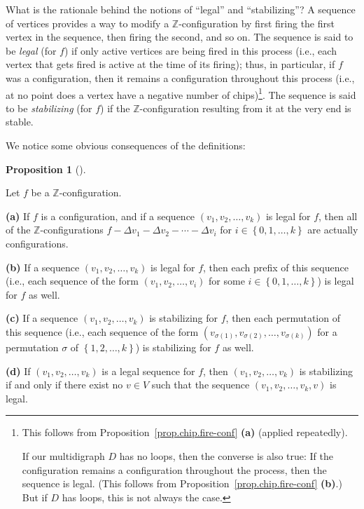 \documentclass[numbers=enddot,12pt,final,onecolumn,notitlepage]{scrartcl}%
\theoremstyle{definition}
\newtheorem{prop}[theo]{Proposition}
\newenvironment{proposition}[1][]
{\begin{prop}[#1]\begin{leftbar}}
{\end{leftbar}\end{prop}}
\newcommand{\ZZ}{\mathbb{Z}}
\newcommand{\set}[1]{\left\{ #1 \right\}}
\newcommand{\tup}[1]{\left( #1 \right)}
\begin{document}
What is the rationale behind the notions of ``legal'' and
``stabilizing''?
A sequence of vertices provides a way to modify a
$\ZZ$-configuration by first firing the first vertex in the
sequence, then firing the second, and so on.
The sequence is said to be \textit{legal} (for $f$) if only
active vertices are being fired in this process
(i.e., each vertex that gets fired is active at the time of
its firing);
thus, in particular, if $f$ was a configuration, then
it remains a configuration throughout this process
(i.e., at no point does a vertex have a negative number of
chips)\footnote{This follows from
Proposition~\ref{prop.chip.fire-conf} \textbf{(a)}
(applied repeatedly).
\par
If our multidigraph $D$ has no loops, then
the converse is also true:
If the configuration remains a configuration throughout the
process, then the sequence is legal.
(This follows from
Proposition~\ref{prop.chip.fire-conf} \textbf{(b)}.)
But if $D$ has loops, this is not always the case.}.
The sequence is said to be \textit{stabilizing} (for $f$) if
the $\ZZ$-configuration resulting from it at the very end is
stable.

We notice some obvious consequences of the definitions:

\begin{proposition} \label{prop.chip.obvious}
Let $f$ be a $\ZZ$-configuration.

\textbf{(a)}
 If $f$ is a configuration, and if
       a sequence $\tup{v_1, v_2, \ldots, v_k}$ is legal
       for $f$, then all of the
       $\ZZ$-configurations
       $f - \Delta v_1 - \Delta v_2 - \cdots - \Delta v_i$
       for $i \in \set{0, 1, \ldots, k}$ are actually
       configurations.

\textbf{(b)}
 If a sequence $\tup{v_1, v_2, \ldots, v_k}$ is legal
       for $f$, then each prefix of this
       sequence (i.e., each sequence of the form
       $\tup{v_1, v_2, \ldots, v_i}$ for some
       $i \in \set{0, 1, \ldots, k}$) is legal for $f$ as
       well.

\textbf{(c)}
  If a sequence $\tup{v_1, v_2, \ldots, v_k}$ is
       stabilizing for $f$, then each
       permutation of this sequence (i.e., each sequence of
       the form
       $\tup{v_{\sigma\tup{1}}, v_{\sigma\tup{2}}, \ldots,
             v_{\sigma\tup{k}}}$ for a permutation
       $\sigma$ of $\set{1, 2, \ldots, k}$) is stabilizing
       for $f$ as well.

\textbf{(d)}
  If $\tup{v_1, v_2, \ldots, v_k}$ is a legal sequence
       for $f$, then
       $\tup{v_1, v_2, \ldots, v_k}$ is stabilizing if and
       only if there exist no $v \in V$ such that the
       sequence $\tup{v_1, v_2, \ldots, v_k, v}$ is legal.
\end{proposition}
\end{document}
